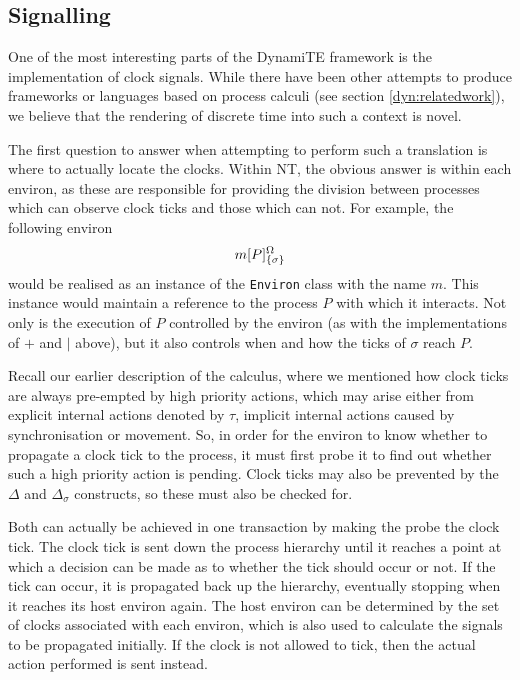 \subsection{Signalling}
\label{dyn:signalling}

One of the most interesting parts of the DynamiTE framework is the
implementation of clock signals.  While there have been other attempts
to produce frameworks or languages based on process calculi (see section
\ref{dyn:relatedwork}), we believe that the rendering of discrete time into
such a context is novel.

The first question to answer when attempting to perform such a
translation is where to actually locate the clocks.  Within NT, the
obvious answer is within each environ, as these are responsible for
providing the division between processes which can observe clock ticks
and those which can not.  For example, the following environ
\begin{displaymath}
{m}[ P ]^{\Omega}_{\{\sigma\}}
\end{displaymath}
would be realised as an instance of the \texttt{Environ} class with the
name $m$.  This instance would maintain a reference to the process $P$
with which it interacts.  Not only is the execution of $P$ controlled by
the environ (as with the implementations of $+$ and $\mid$ above), but
it also controls when and how the ticks of $\sigma$ reach $P$.

Recall our earlier description of the calculus, where we mentioned how
clock ticks are always pre-empted by high priority actions, which may
arise either from explicit internal actions denoted by $\tau$, implicit
internal actions caused by synchronisation or movement.  So, in order
for the environ to know whether to propagate a clock tick to the
process, it must first probe it to find out whether such a high priority
action is pending.  Clock ticks may also be prevented by the $\Delta$
and $\Delta_\sigma$ constructs, so these must also be checked for.

Both can actually be achieved in one transaction by making the probe the
clock tick.  The clock tick is sent down the process hierarchy until it
reaches a point at which a decision can be made as to whether the tick
should occur or not.  If the tick can occur, it is propagated back up
the hierarchy, eventually stopping when it reaches its host environ
again.  The host environ can be determined by the set of clocks
associated with each environ, which is also used to calculate the
signals to be propagated initially.  If the clock is not allowed to
tick, then the actual action performed is sent instead.

